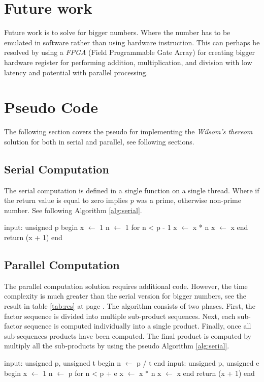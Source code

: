 \documentclass[12pt, oneside, onecolumn]{article}
\begin{document}

%
\section{Future work}
Future work is to solve for bigger numbers. Where the number has to be emulated in software rather than using hardware instruction. This can perhaps be resolved by using a \textit{FPGA} (Field Programmable Gate Array) for creating bigger hardware register for performing addition, multiplication, and division with low latency and potential with parallel processing.

\section{Pseudo Code}
The following section covers the pseudo for implementing the \emph{Wilsom's thereom} solution for both in serial and parallel, see following sections.

\subsection{Serial Computation}
The serial computation is defined in a single function on a single thread. Where if the return value is equal to zero implies \emph{p} was a prime, otherwise non-prime number. See following Algorithm \ref{alg:serial}.
\begin{algorithm}[caption={Serial Computation.},label={alg:serial}]
input: unsigned p
begin
	x $\gets$ 1
	n $\gets$ 1
	for n < p - 1
		x $\gets$ x * n
		x $\gets$ x %
	end
	return (x + 1) %
end
\end{algorithm}

\subsection{Parallel Computation}
The parallel computation solution requires additional code. However, the time complexity is much greater than the serial version for bigger numbers, see the result in table \ref{tab:res} at page \pageref{tab:res}.
The algorithm consists of two phases. First, the factor sequence is divided into multiple sub-product sequences. Next, each sub-factor sequence is computed individually into a single product. Finally, once all sub-sequences products have been computed. The final product is computed by multiply all the sub-products by using the pseudo Algorithm \ref{alg:serial}.

\begin{algorithm}[caption={Wilsom's Prime - Parallel Computation.},label={alg:parallel}]
input: unsigned p, unsigned t
begin
	n $\gets$ p / t
end
input: unsigned p, unsigned e
begin
	x $\gets$ 1
	n $\gets$ p
	for n < p + e
		x $\gets$ x * n
		x $\gets$ x %
	end
	return (x + 1) %
end
\end{algorithm}



\end{document}
